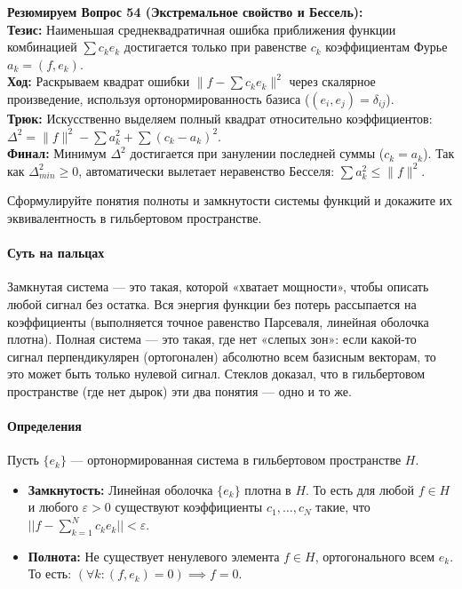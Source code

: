 \begin{tcolorbox}[colback=gray!5, colframe=black, boxrule=0.5pt, arc=0pt]
\textbf{Резюмируем Вопрос 54 (Экстремальное свойство и Бессель):} \\
\textbf{Тезис:} Наименьшая среднеквадратичная ошибка приближения функции комбинацией $\sum c_k e_k$ достигается только при равенстве $c_k$ коэффициентам Фурье $a_k = (f,e_k)$. \\
\textbf{Ход:} Раскрываем квадрат ошибки $\|f - \sum c_k e_k\|^2$ через скалярное произведение, используя ортонормированность базиса ($(e_i,e_j)=\delta_{ij}$). \\
\textbf{Трюк:} Искусственно выделяем полный квадрат относительно коэффициентов: $\Delta^2 = \|f\|^2 - \sum a_k^2 + \sum (c_k - a_k)^2$. \\
\textbf{Финал:} Минимум $\Delta^2$ достигается при занулении последней суммы ($c_k = a_k$). Так как $\Delta_{min}^2 \ge 0$, автоматически вылетает неравенство Бесселя: $\sum a_k^2 \le \|f\|^2$.
\end{tcolorbox}





{Сформулируйте понятия полноты и замкнутости системы функций и докажите их эквивалентность в гильбертовом пространстве.}

\paragraph{Суть на пальцах}
Замкнутая система — это такая, которой «хватает мощности», чтобы описать любой сигнал без остатка. Вся энергия функции без потерь рассыпается на коэффициенты (выполняется точное равенство Парсеваля, линейная оболочка плотна). Полная система — это такая, где нет «слепых зон»: если какой-то сигнал перпендикулярен (ортогонален) абсолютно всем базисным векторам, то это может быть только нулевой сигнал. Стеклов доказал, что в гильбертовом пространстве (где нет дырок) эти два понятия — одно и то же.

\paragraph{Определения}
Пусть $\{e_k\}$ — ортонормированная система в гильбертовом пространстве $H$.
\begin{itemize}
    \item \textbf{Замкнутость:} Линейная оболочка $\{e_k\}$ плотна в $H$. То есть для любой $f \in H$ и любого $\varepsilon > 0$ существуют коэффициенты $c_1, \dots, c_N$ такие, что $||f - \sum_{k=1}^N c_k e_k|| < \varepsilon$.
    \item \textbf{Полнота:} Не существует ненулевого элемента $f \in H$, ортогонального всем $e_k$. То есть: $(\forall k: (f, e_k) = 0) \implies f = 0$.
\end{itemize}

